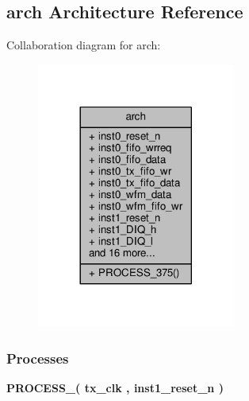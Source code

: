 \subsection{arch Architecture Reference}
\label{classrxtx__top_1_1arch}


Collaboration diagram for arch\+:\nopagebreak
\begin{figure}[H]
\begin{center}
\leavevmode
\includegraphics[width=185pt]{d5/d86/classrxtx__top_1_1arch__coll__graph}
\end{center}
\end{figure}
\subsubsection*{Processes}
 \begin{DoxyCompactItemize}
\item 
{\bf P\+R\+O\+C\+E\+S\+S\+\_}{\bfseries  ( {\bfseries {\bfseries {\bf tx\+\_\+clk}} \textcolor{vhdlchar}{ }} , {\bfseries {\bfseries {\bf inst1\+\_\+reset\+\_\+n}} \textcolor{vhdlchar}{ }} )}
\end{DoxyCompactItemize}
